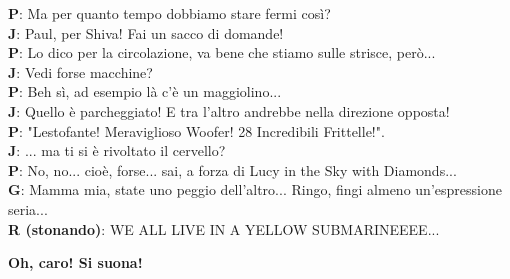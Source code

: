 \documentclass{article}
\begin{document}
{\bf P}: Ma per quanto tempo dobbiamo stare fermi così?\\
{\bf J}: Paul, per Shiva! Fai un sacco di domande!\\
{\bf P}: Lo dico per la circolazione, va bene che stiamo sulle strisce, però...\\
{\bf J}: Vedi forse macchine?\\
{\bf P}: Beh sì, ad esempio là c'è un maggiolino...\\
{\bf J}: Quello è parcheggiato! E tra l'altro andrebbe nella direzione opposta!\\
{\bf P}: "Lestofante! Meraviglioso Woofer! 28 Incredibili Frittelle!".\\
{\bf J}: ... ma ti si è rivoltato il cervello?\\
{\bf P}: No, no... cioè, forse... sai, a forza di Lucy in the Sky with Diamonds...\\
{\bf G}: Mamma mia, state uno peggio dell'altro... Ringo, fingi almeno un'espressione seria...\\
{\bf R (stonando)}: WE ALL LIVE IN A YELLOW SUBMARINEEEE...\\
\begin{center}
{\bf Oh, caro! Si suona!\\}
\end{center}
\vspace{0.3cm}
\end{document}
